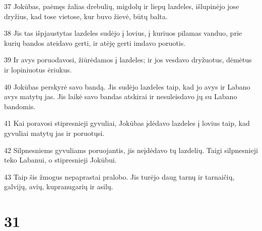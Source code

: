 \par 37 Jokūbas, paėmęs žalias drebulių, migdolų ir liepų lazdeles, išlupinėjo jose dryžius, kad tose vietose, kur buvo žievė, būtų balta. 
\par 38 Jis tas išpjaustytas lazdeles sudėjo į lovius, į kuriuos pilamas vanduo, prie kurių bandos ateidavo gerti, ir atėję gerti imdavo poruotis. 
\par 39 Ir avys poruodavosi, žiūrėdamos į lazdeles; ir jos vesdavo dryžuotus, dėmėtus ir lopiniuotus ėriukus. 
\par 40 Jokūbas perskyrė savo bandą. Jis sudėjo lazdeles taip, kad jo avys ir Labano avys matytų jas. Jis laikė savo bandas atskirai ir nesuleisdavo jų su Labano bandomis. 
\par 41 Kai poravosi stipresnieji gyvuliai, Jokūbas įdėdavo lazdeles į lovius taip, kad gyvuliai matytų jas ir poruotųsi. 
\par 42 Silpnesniems gyvuliams poruojantis, jis neįdėdavo tų lazdelių. Taigi silpnesnieji teko Labanui, o stipresnieji Jokūbui. 
\par 43 Taip šis žmogus nepaprastai pralobo. Jis turėjo daug tarnų ir tarnaičių, galvijų, avių, kupranugarių ir asilų.



\chapter{31}

